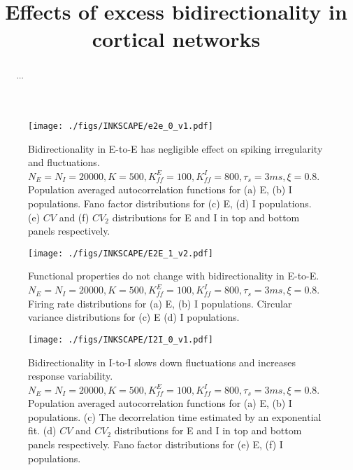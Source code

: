 \documentclass[10pt, a4paper, twocolumn]{article}
\title{Effects of excess bidirectionality in cortical networks}
\date{}
\begin{document}
\maketitle
\begin{@twocolumnfalse}
    \maketitle
    \begin{abstract}
      ...
    \end{abstract}
  \end{@twocolumnfalse}






\newpage
\begin{small}


\end{small}

\newpage
\begin{figure*}
\centering
\texttt{[image: ./figs/INKSCAPE/e2e\_0\_v1.pdf]}
\caption{\small{Bidirectionality in E-to-E has negligible effect on spiking irregularity and fluctuations. $N_E = N_I = 20000, K = 500, K_{ff}^E = 100, K_{ff}^I = 800, \tau_s = 3ms, \xi = 0.8$. Population averaged autocorrelation functions for (a) E, (b) I populations. Fano factor distributions for (c) E, (d) I populations. (e) $CV$ and (f) $CV_{2}$ distributions for E and I in top and bottom panels respectively.}}
\label{fig:e2e0}
\end{figure*}

\begin{figure*}
\centering
\texttt{[image: ./figs/INKSCAPE/E2E\_1\_v2.pdf]}
\caption{\small{Functional properties do not change with bidirectionality in E-to-E. $N_E = N_I = 20000, K = 500, K_{ff}^E = 100, K_{ff}^I = 800, \tau_s = 3ms, \xi = 0.8$. Firing rate distributions for (a) E, (b) I populations. Circular variance distributions for (c) E (d) I populations.}}
\label{fig:e2e1}
\end{figure*}

\begin{figure*}
\centering
\texttt{[image: ./figs/INKSCAPE/I2I\_0\_v1.pdf]}
\caption{\small{Bidirectionality in I-to-I slows down fluctuations and increases response variability. $N_E = N_I = 20000, K = 500, K_{ff}^E = 100, K_{ff}^I = 800, \tau_s = 3ms, \xi = 0.8$. Population averaged autocorrelation functions for (a) E, (b) I populations. (c) The decorrelation time estimated by an exponential fit. (d) $CV$ and $CV_{2}$ distributions for E and I in top and bottom panels respectively. Fano factor distributions for (e) E, (f) I populations.}}
\label{fig:i2i0}
\end{figure*}
               
\end{document}
